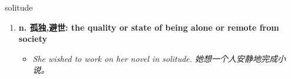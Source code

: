 
\begin{frame}
{\huge solitude}
\begin{center}
\begin{enumerate}\Large
  \item \textbf{n. 孤独,避世: the quality or state of being alone or remote from society}
  \begin{itemize}
    \item \em{\Large{She wished to work on her novel in solitude. 她想一个人安静地完成小说。}}
  \end{itemize}
\end{enumerate}
\end{center}
\end{frame}
